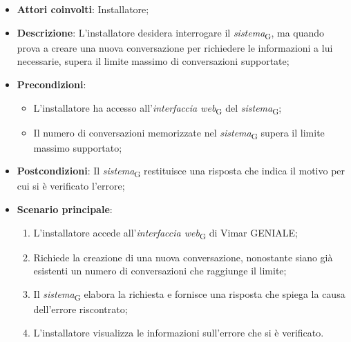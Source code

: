 \begin{itemize}
    \item \textbf{Attori coinvolti}: Installatore;
    \item \textbf{Descrizione}: L’installatore desidera interrogare il \textit{sistema}\textsubscript{G}, ma quando prova a creare una nuova conversazione per richiedere le informazioni a lui necessarie, supera il limite massimo di conversazioni supportate;
    \item \textbf{Precondizioni}: 
        \begin{itemize}
            \item L’installatore ha accesso all’\textit{interfaccia web}\textsubscript{G} del \textit{sistema}\textsubscript{G};
            \item Il numero di conversazioni memorizzate nel \textit{sistema}\textsubscript{G} supera il limite massimo supportato;
        \end{itemize}
    \item \textbf{Postcondizioni}:  Il \textit{sistema}\textsubscript{G} restituisce una risposta che indica il motivo per cui si è verificato l’errore;
    \item \textbf{Scenario principale}:
    \begin{enumerate}
    \item L’installatore accede all’\textit{interfaccia web}\textsubscript{G} di Vimar GENIALE;
    \item Richiede la creazione di una nuova conversazione, nonostante siano già esistenti un numero di conversazioni che raggiunge il limite;
    \item Il \textit{sistema}\textsubscript{G} elabora la richiesta e fornisce una risposta che spiega la causa dell'errore riscontrato;
    \item L’installatore visualizza le informazioni sull’errore che si è verificato.
    \end{enumerate}
\end{itemize}



